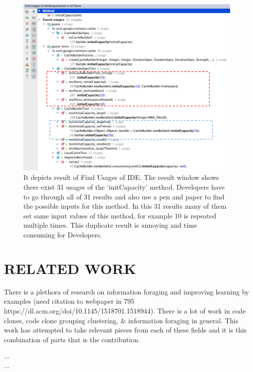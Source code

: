 \documentclass[conference]{IEEEtran}
\begin{document}
\begin{figure}
    \centering
    \includegraphics [width=\columnwidth,keepaspectratio, clip]{figures/Picture1.png}
    \caption{It depicts result of Find Usages of IDE. The result window shows there exist 31 usages of the ‘initCapacity’ method. Developers have to go through all of 31 results and also use a pen and paper to find the possible inputs for this method. In this 31 results many of them set same input values of this method, for example 10 is repeated multiple times. This duplicate result is annoying and time consuming for Developers. 
}
    \label{fig:usege}
\end{figure}
\section{RELATED WORK}
There is a plethora of research on information foraging and improving learning by examples (need citation to webpaper in 795 https://dl.acm.org/doi/10.1145/1518701.1518944). There is a lot of work in code clones, code clone grouping clustering, \& information foraging in general. This work has attempted to take relevant pieces from each of these fields and it is this combination of parts that is the contribution. 

...\\
...\\
\end{document}
